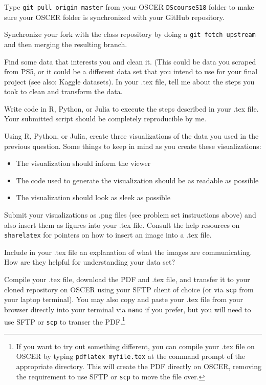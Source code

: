 \documentclass[12pt,english]{exam}
\begin{document}
\begin{questions}
\question Type \texttt{git pull origin master} from your OSCER \texttt{DScourseS18} folder to make sure your OSCER folder is synchronized with your GitHub repository. 

\question Synchronize your fork with the class repository by doing a \texttt{git fetch upstream} and then merging the resulting branch. 

\question Find some data that interests you and clean it. (This could be data you scraped from PS5, or it could be a different data set that you intend to use for your final project (see also: Kaggle datasets). In your .tex file, tell me about the steps you took to clean and transform the data.

Write code in R, Python, or Julia to execute the steps described in your .tex file. Your submitted script should be completely reproducible by me.

\question Using R, Python, or Julia, create three visualizations of the data you used in the previous question. Some things to keep in mind as you create these visualizations:
\begin{itemize}
    \item The visualization should inform the viewer
    \item The code used to generate the visualization should be as readable as possible
    \item The visualization should look as sleek as possible
\end{itemize}

Submit your visualizations as .png files (see problem set instructions above) and also insert them as figures into your .tex file. Consult the help resources on \texttt{sharelatex} for pointers on how to insert an image into a .tex file.

\question Include in your .tex file an explanation of what the images are communicating. How are they helpful for understanding your data set?

\question Compile your .tex file, download the PDF and .tex file, and transfer it to your cloned repository on OSCER using your SFTP client of choice (or via \texttt{scp} from your laptop terminal). You may also copy and paste your .tex file from your browser directly into your terminal via \texttt{nano} if you prefer, but you will need to use SFTP or \texttt{scp} to transer the PDF.\footnote{If you want to try out something different, you can compile your .tex file on OSCER by typing \texttt{pdflatex myfile.tex} at the command prompt of the appropriate directory. This will create the PDF directly on OSCER, removing the requirement to use SFTP or \texttt{scp} to move the file over.}


\end{questions}
\end{document}
